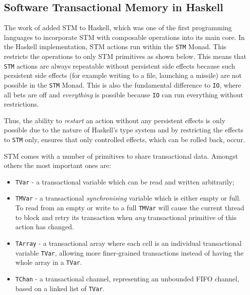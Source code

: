 \subsection{Software Transactional Memory in Haskell}
The work of \cite{harris_composable_2005, harris_transactional_2006} added STM to Haskell, which was one of the first programming languages to incorporate STM with composable operations into its main core. In the Haskell implementation, STM actions run within the \texttt{STM} Monad. This restricts the operations to only STM primitives as shown below. This means that \texttt{STM} actions are always repeatable without persistent side effects because such persistent side effects (for example writing to a file, launching a missile) are not possible in the \texttt{STM} Monad. This is also the fundamental difference to \texttt{IO}, where all bets are off and \textit{everything} is possible because \texttt{IO} can run everything without restrictions.

Thus, the ability to \textit{restart} an action without any persistent effects is only possible due to the nature of Haskell's type system and by restricting the effects to \texttt{STM} only, ensures that only controlled effects, which can be rolled back, occur.

STM comes with a number of primitives to share transactional data. Amongst others the most important ones are:

\begin{itemize}
	\item \texttt{TVar} - a transactional variable which can be read and written arbitrarily;
	
	\item \texttt{TMVar} - a transactional \textit{synchronising} variable which is either empty or full. To read from an empty or write to a full \texttt{TMVar} will cause the current thread to block and retry its transaction when \textit{any} transactional primitive of this action has changed.
	
	\item \texttt{TArray} - a transactional array where each cell is an individual transactional variable \texttt{TVar}, allowing more finer-grained transactions instead of having the whole array in a \texttt{TVar}.
	
	\item \texttt{TChan} - a transactional channel, representing an unbounded FIFO channel, based on a linked list of \texttt{TVar}.
\end{itemize}

